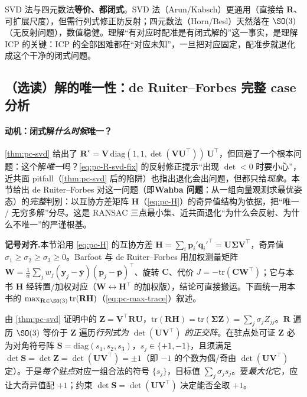 \begin{insight}
SVD 法与四元数法\textbf{等价、都闭式}。SVD 法（Arun/Kabsch）更通用（直接给 $\mathbf{R}$、可扩展尺度），但需行列式修正防反射；四元数法（Horn/Besl）天然落在 $\SO(3)$（无反射问题），数值稳健。理解“有对应时配准是有闭式解的”这一事实，是理解 ICP 的关键：ICP 的全部困难都在“对应未知”，一旦把对应固定，配准步就退化成这个干净的闭式问题。
\end{insight}

\subsection{（选读）解的唯一性：de Ruiter--Forbes 完整 case 分析}
\label{sec:pc-icp-uniqueness}

\paragraph{动机：闭式解\emph{什么时候}唯一？}
\cref{thm:pc-svd} 给出了 $\mathbf{R}^\star=\mathbf{V}\,\mathrm{diag}(1,1,\det(\mathbf{V}\mathbf{U}^\top))\,\mathbf{U}^\top$，但回避了一个根本问题：这个解\emph{唯一}吗？\cref{eq:pc-R-svd-fix} 的反射修正提示“出现 $\det<0$ 时要小心”，近共面 pitfall（\cref{thm:pc-svd} 后的陷阱）也指出退化会出问题，但都只给\emph{现象}。本节给出 de Ruiter--Forbes\cite{deruiter2013wahba} 对这一问题（即\textbf{Wahba 问题}：从一组向量观测求最优姿态）的\emph{完整}判别：以互协方差矩阵 $\mathbf{H}$（\cref{eq:pc-H}）的奇异值结构为依据，把“唯一 / 无穷多解”分尽。这是 RANSAC 三点最小集、近共面退化“为什么会反射、为什么不唯一”的严谨根基。

\begin{note}
\textbf{记号对齐.}\;本节沿用 \cref{eq:pc-H} 的互协方差 $\mathbf{H}=\sum_i\mathbf{p}_i'\mathbf{q}_i'^\top=\mathbf{U}\boldsymbol{\Sigma}\mathbf{V}^\top$，奇异值 $\sigma_1\ge\sigma_2\ge\sigma_3\ge0$。Barfoot\cite{barfoot2024state} 与 de Ruiter--Forbes 用加权测量矩阵 $\mathbf{W}=\frac1w\sum_j w_j(\mathbf{y}_j-\bar{\mathbf{y}})(\mathbf{p}_j-\bar{\mathbf{p}})^\top$、旋转 $\mathbf{C}$、代价 $J=-\mathrm{tr}(\mathbf{C}\mathbf{W}^\top)$；它与本书 $\mathbf{H}$ 经转置/加权对应（$\mathbf{W}\leftrightarrow\mathbf{H}^\top$ 的加权版），结论可直接搬运。下面统一用本书的 $\max_{\mathbf{R}\in\SO(3)}\mathrm{tr}(\mathbf{R}\mathbf{H})$（\cref{eq:pc-max-trace}）叙述。
\end{note}

\begin{derivation}
由 \cref{thm:pc-svd} 证明中的 $\mathbf{Z}=\mathbf{V}^\top\mathbf{R}\mathbf{U}$，$\mathrm{tr}(\mathbf{R}\mathbf{H})=\mathrm{tr}(\boldsymbol{\Sigma}\mathbf{Z})=\sum_j\sigma_j Z_{jj}$。$\mathbf{R}$ 遍历 $\SO(3)$ 等价于 $\mathbf{Z}$ 遍历\emph{行列式为 $\det(\mathbf{U}\mathbf{V}^\top)$ 的正交阵}。在驻点处可证 $\mathbf{Z}$ 必为对角符号阵 $\mathbf{S}=\mathrm{diag}(s_1,s_2,s_3)$，$s_j\in\{+1,-1\}$，且须满足 $\det\mathbf{S}=\det\mathbf{Z}=\det(\mathbf{U}\mathbf{V}^\top)=\pm1$（即 $-1$ 的个数为偶/奇由 $\det(\mathbf{U}\mathbf{V}^\top)$ 定）。于是\emph{每个驻点}对应一组合法的符号 $\{s_j\}$，目标值 $\sum_j\sigma_j s_j$。要\emph{最大化}它，应让大奇异值配 $+1$；约束 $\det\mathbf{S}=\det(\mathbf{U}\mathbf{V}^\top)$ 决定能否全取 $+1$。
\end{derivation}

